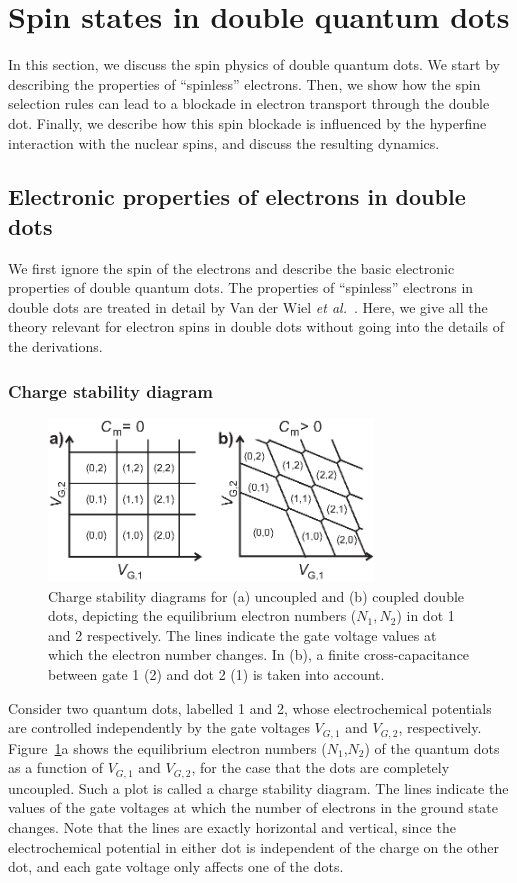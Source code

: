 \documentclass[rmp,twocolumn,aps]{revtex4}
\begin{document}
\section{Spin states in double quantum dots}
\label{Section:DoubleDotSpin} In this section, we discuss the spin
physics of double quantum dots. We start by describing the
properties of ``spinless'' electrons. Then, we show how the spin
selection rules can lead to a blockade in electron transport
through the double dot. Finally, we describe how this spin
blockade is influenced by the hyperfine interaction with the
nuclear spins, and discuss the resulting dynamics.

\subsection{Electronic properties of electrons in double dots}
\label{DDspinless} We first ignore the spin of the electrons and
describe the basic electronic properties of double quantum dots.
The properties of ``spinless'' electrons in double dots are
treated in detail by Van der Wiel \textit{et
al.}~\cite{WielRMP2003}. Here, we give all the theory relevant for
electron spins in double dots without going into the details of
the derivations.

\subsubsection{Charge stability diagram}
\begin{figure}[htb]
\includegraphics[width=3.4in, clip=true]{hanson_fig27.eps}
\caption{Charge stability diagrams for (a) uncoupled and (b)
coupled double dots, depicting the equilibrium electron numbers
($N_1,N_2$) in dot 1 and 2 respectively. The lines indicate the
gate voltage values at which the electron number changes. In (b),
a finite cross-capacitance between gate 1 (2) and dot 2 (1) is
taken into account.} \label{Fig:DDChargDiagr}
\end{figure}

Consider two quantum dots, labelled 1 and 2, whose electrochemical
potentials are controlled independently by the gate voltages
$V_{G,1}$ and $V_{G,2}$, respectively.
Figure~\ref{Fig:DDChargDiagr}a shows the equilibrium electron
numbers ($N_1$,$N_2$) of the quantum dots as a function of
$V_{G,1}$ and $V_{G,2}$, for the case that the dots are completely
uncoupled. Such a plot is called a charge stability diagram. The
lines indicate the values of the gate voltages at which the number
of electrons in the ground state changes. Note that the lines are
exactly horizontal and vertical, since the electrochemical
potential in either dot is independent of the charge on the other
dot, and each gate voltage only affects one of the dots.
\end{document}
